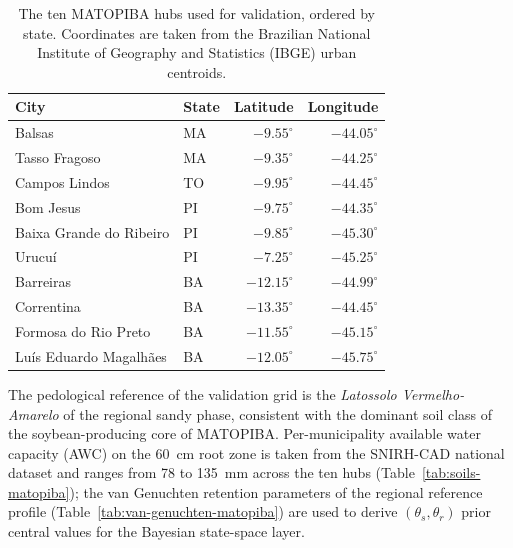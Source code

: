 \documentclass[review,5p,times]{elsarticle}
\begin{document}
\begin{table}[!t]
\centering
\caption{The ten MATOPIBA hubs used for validation, ordered by
state. Coordinates are taken from the Brazilian National Institute of
Geography and Statistics (IBGE) urban centroids.}
\label{tab:cities}
\begin{tabular}{llrr}
\toprule
City & State & Latitude & Longitude \\
\midrule
Balsas                   & MA & $-9.55^{\circ}$  & $-44.05^{\circ}$ \\
Tasso Fragoso            & MA & $-9.35^{\circ}$  & $-44.25^{\circ}$ \\
Campos Lindos            & TO & $-9.95^{\circ}$  & $-44.45^{\circ}$ \\
Bom Jesus                & PI & $-9.75^{\circ}$  & $-44.35^{\circ}$ \\
Baixa Grande do Ribeiro  & PI & $-9.85^{\circ}$  & $-45.30^{\circ}$ \\
Urucu\'i                 & PI & $-7.25^{\circ}$  & $-45.25^{\circ}$ \\
Barreiras                & BA & $-12.15^{\circ}$ & $-44.99^{\circ}$ \\
Correntina               & BA & $-13.35^{\circ}$ & $-44.45^{\circ}$ \\
Formosa do Rio Preto     & BA & $-11.55^{\circ}$ & $-45.15^{\circ}$ \\
Lu\'is Eduardo Magalh\~aes & BA & $-12.05^{\circ}$ & $-45.75^{\circ}$ \\
\bottomrule
\end{tabular}
\end{table}

The pedological reference of the validation grid is the
\textit{Latossolo Vermelho-Amarelo} of the regional sandy phase,
consistent with the dominant soil class of the soybean-producing
core of MATOPIBA. Per-municipality available water capacity (AWC)
on the 60~cm root zone is taken from the SNIRH-CAD national dataset
\citep{SantosANAUFPR_TED,SNIRH28fe4baa} and ranges from 78 to
135~mm across the ten hubs (Table~\ref{tab:soils-matopiba}); the
van Genuchten retention parameters of the regional reference profile
(Table~\ref{tab:van-genuchten-matopiba}) are used to derive
$(\theta_s, \theta_r)$ prior central values for the Bayesian
state-space layer.




\end{document}

